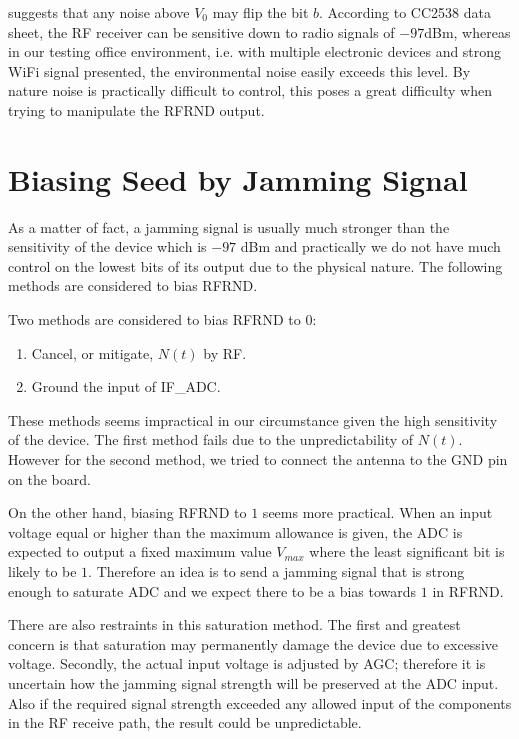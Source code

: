  suggests that any noise above $V_0$ may flip the bit $b$. According to CC2538 data sheet\cite{CC2538_Datasheet}, the RF receiver can be sensitive down to radio signals of $-97$dBm, whereas in our testing office environment, i.e. with multiple electronic devices and strong WiFi signal presented, the environmental noise easily exceeds this level. By nature noise is practically difficult to control, this poses a great difficulty when trying to manipulate the RFRND output.

\section{Biasing Seed by Jamming Signal}

As a matter of fact, a jamming signal is usually much stronger than the sensitivity of the device which is $-97$ dBm and practically we do not have much control on the lowest bits of its output due to the physical nature. The following methods are considered to bias RFRND.

\begin{itemize}
\end{itemize}

Two methods are considered to bias RFRND to $0$:
\begin{enumerate}
	\item Cancel, or mitigate, $N(t)$ by RF.  
	\item Ground the input of IF\_ADC. 
\end{enumerate}

These methods seems impractical in our circumstance given the high sensitivity of the device. The first method fails due to the unpredictability of $N(t)$. However for the second method, we tried to connect the antenna to the GND pin on the board. %

On the other hand, biasing RFRND to $1$ seems more practical. When an input voltage equal or higher than the maximum allowance is given, the ADC is expected to output a fixed maximum value $V_{max}$ where the least significant bit is likely to be $1$. Therefore an idea is to send a jamming signal that is strong enough to saturate ADC and we expect there to be a bias towards $1$ in RFRND.

There are also restraints in this saturation method.  The first and greatest concern is that saturation may permanently damage the device due to excessive voltage. Secondly, the actual input voltage is adjusted by AGC; therefore it is uncertain how the jamming signal strength will be preserved at the ADC input. Also if the required signal strength exceeded any allowed input of the components in the RF receive path, the result could be unpredictable.

